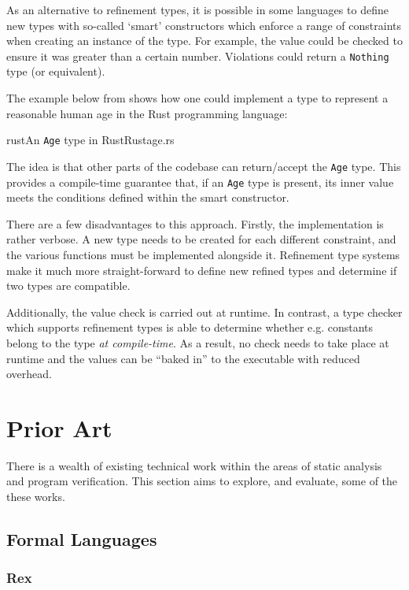 \documentclass[a4paper,openany,12pt]{book}
\begin{document}
As an alternative to refinement types, it is possible in some languages to define new types with so-called `smart'
constructors which enforce a range of constraints when creating an instance of the type.
For example, the value could be checked to ensure it was greater than a certain number.
Violations could return a \texttt{Nothing} type (or equivalent).

The example below from \citet{jkcclemens} shows how one could implement a type to represent a reasonable human age in
the Rust programming language:

\begin{mycodefile}{rust}{An \texttt{Age} type in Rust}{Rust}{age.rs}
\end{mycodefile}

The idea is that other parts of the codebase can return/accept the \texttt{Age} type.
This provides a compile-time guarantee that, if an \texttt{Age} type is present, its inner value meets the conditions
defined within the smart constructor.

There are a few disadvantages to this approach.
Firstly, the implementation is rather verbose.
A new type needs to be created for each different constraint, and the various functions must be implemented alongside
it.
Refinement type systems make it much more straight-forward to define new refined types and determine if two types are
compatible.

Additionally, the value check is carried out at runtime.
In contrast, a type checker which supports refinement types is able to determine whether e.g. constants belong to the
type \emph{at compile-time}.
As a result, no check needs to take place at runtime and the values can be ``baked in'' to the executable with
reduced overhead.

\section{Prior Art}\label{sec:prior-art}

There is a wealth of existing technical work within the areas of static analysis and program verification.
This section aims to explore, and evaluate, some of the these works.

\subsection{Formal Languages}

\subsubsection{Rex}
\end{document}
